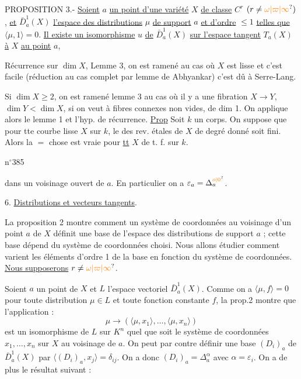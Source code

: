 PROPOSITION 3.- \uline{Soient} $a$ \uline{un point d'une variété} $X$ \uline{de classe} $C^r$ $(r\ne\unsure{\omega|\varpi|\infty})$, \uline{et} $\bar D_a^1(X)$ \uline{l'espace des distributions} $\mu$ \uline{de support} $a$ \uline{et d'ordre} $\leq 1$ \uline{telles que} $\langle\mu,1\rangle=0$. \uline{Il existe un isomorphisme} $u$ \uline{de} $\bar D_a^1(X)$ \uline{sur l'espace tangent} $T_a(X)$ \uline{à} $X$ \uline{au point} $a$,

 Récurrence sur $\dim X$,    Lemme 3, on est ramené au cas où $X$ est lisse et   c'est facile (réduction au cas complet par lemme de Abhyankar)  c'est dû à  Serre-Lang. 

Si $\dim X\geq 2$, on est ramené   lemme 3 au cas où il y a une fibration  $X\longrightarrow Y$, $\dim Y<\dim X$,  si on veut à fibres  connexes non vides, de dim 1. On applique alors le lemme 1 et l'hyp. de récurrence.
\uline{Prop} Soit $k$ un corps. On suppose que pour tte  courbe  lisse $X$ sur $k$, le  des rev. étales de $X$ de degré donné soit fini. Alors la $=$ chose est vraie pour \uline{tt} $X$ de t. f. sur $k$.

n$^{\circ}$385

dans un voisinage ouvert de $a$. En particulier on a $\varepsilon_a=\Delta_a^{\unsure{o|0}}$.

6. \uline{Distributions et vecteurs tangents}.

La proposition 2 montre comment un système de coordonnées au voisinage d'un point $a$ de $X$ définit une base de l'espace des distributions de support $a$ ; cette base dépend du système de coordonnées choisi. Nous allons étudier comment varient les éléments d'ordre 1 de la base en fonction du système de coordonnées. \uline{Nous supposerons} $r\ne\unsure{\omega|\varpi|\infty}$.

Soient $a$ un point de $X$ et $L$ l'espace vectoriel $\bar D_a^1(X)$. Comme on a $\langle\mu,f\rangle=0$ pour toute distribution $\mu\in L$ et toute fonction constante $f$, la prop.2 montre que l'application :
\[
\mu\longrightarrow(\langle\mu,x_1\rangle,\ldots,\langle\mu,x_n\rangle)\tag*{(22)}
\]
est un isomorphisme de $L$ sur $K^n$ quel que soit le système de coordonnées $x_1,\ldots,x_n$ sur $X$ au voisinage de $a$. On peut par contre définir une base $(D_i)_a$ de $\bar D_a^1(X)$ par $\langle(D_i)_a,x_j\rangle=\delta_{ij}$. On a donc $(D_i)_a=\Delta_a^\alpha$ avec $\alpha=\varepsilon_i$. On a de plus le résultat suivant :

